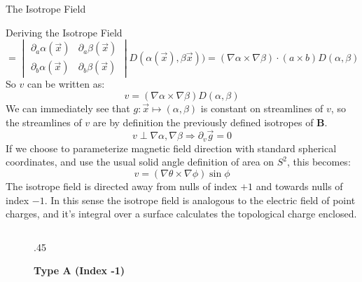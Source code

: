 \documentclass[final]{beamer}
\newlength{\onecolwid}
\begin{document}
\begin{frame}[t]
\begin{columns}[t]
\begin{column}{\onecolwid}
\begin{block}{\huge{The Isotrope Field}}
\begin{block}{Deriving the Isotrope Field}
\begin{equation}
    =\begin{vmatrix}
      \partial_a\alpha(\vec{x}) & \partial_a\beta(\vec{x}) \\
      \partial_b\alpha(\vec{x}) & \partial_b\beta(\vec{x})
    \end{vmatrix}
    D(\alpha(\vec{x}),\beta\vec{x}))
    =(\nabla\alpha\times\nabla\beta)\cdot(a\times b)D(\alpha,\beta)
  \end{equation}
  So $v$ can be written as:
  {\Large
  \begin{equation}
    \boxed{v=(\nabla\alpha\times\nabla\beta)D(\alpha,\beta)}
  \end{equation}
  }
  We can immediately see that $g:\vec{x}\mapsto (\alpha,\beta)$ is constant on streamlines of $v$, so the streamlines of $v$ are by definition the previously defined isotropes of $\mathbf{B}$.
  \begin{equation}
    v\perp\nabla\alpha,\nabla\beta\Rightarrow\partial_v\vec g=0
  \end{equation}
  If we choose to parameterize magnetic field direction with standard spherical coordinates,
  and use the usual solid angle definition of area on $S^2$, this becomes:
  {\Large
  \begin{equation}
    \boxed{v=(\nabla\theta\times\nabla\phi)\sin\phi}
  \end{equation}
  }
  The isotrope field is directed away from nulls of index $+1$ and towards nulls of
  index $-1$.
  In this sense the isotrope field is analogous to the electric field of  point charges, and it's
  integral over a surface calculates the topological charge enclosed.\\
  \begin{figure}
  \begin{columns}[t,totalwidth=\onecolwid] %
    \begin{column}{.45\onecolwid}
        \begin{centering}
        \textbf{Type A (Index -1)}
        \begin{figure}

\end{figure}
\end{centering}
\end{column}
\end{columns}
\end{figure}
\end{block}
\end{block}
\end{column}
\end{columns}
\end{frame}
\end{document}
